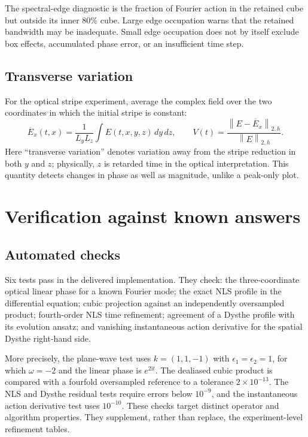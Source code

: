 \documentclass[10pt,letterpaper]{article}
\numberwithin{equation}{section}
\newcommand{\ii}{\mathrm{i}}
\newcommand{\norm}[1]{\left\|#1\right\|}
\begin{document}
The spectral-edge diagnostic is the fraction of Fourier action in the retained cube but outside its inner $80\%$ cube. Large edge occupation warns that the retained bandwidth may be inadequate. Small edge occupation does not by itself exclude box effects, accumulated phase error, or an insufficient time step.

\subsection{Transverse variation}
For the optical stripe experiment, average the complex field over the two coordinates in which the initial stripe is constant:
\begin{equation}
 \overline E_x(t,x)=\frac{1}{L_yL_z}\int E(t,x,y,z)\,dy\,dz,
 \qquad V(t)=\frac{\norm{E-\overline E_x}_{2,h}}{\norm E_{2,h}}.\label{eq:transverse}
\end{equation}
Here ``transverse variation'' denotes variation away from the stripe reduction in both $y$ and $z$; physically, $z$ is retarded time in the optical interpretation. This quantity detects changes in phase as well as magnitude, unlike a peak-only plot.

\section{Verification against known answers}
\subsection{Automated checks}
Six tests pass in the delivered implementation. They check: the three-coordinate optical linear phase for a known Fourier mode; the exact NLS profile in the differential equation; cubic projection against an independently oversampled product; fourth-order NLS time refinement; agreement of a Dysthe profile with its evolution ansatz; and vanishing instantaneous action derivative for the spatial Dysthe right-hand side.

More precisely, the plane-wave test uses $k=(1,1,-1)$ with $\epsilon_1=\epsilon_2=1$, for which $\omega=-2$ and the linear phase is $e^{2\ii t}$. The dealiased cubic product is compared with a fourfold oversampled reference to a tolerance $2\times10^{-13}$. The NLS and Dysthe residual tests require errors below $10^{-9}$, and the instantaneous action derivative test uses $10^{-10}$. These checks target distinct operator and algorithm properties. They supplement, rather than replace, the experiment-level refinement tables.
\end{document}
